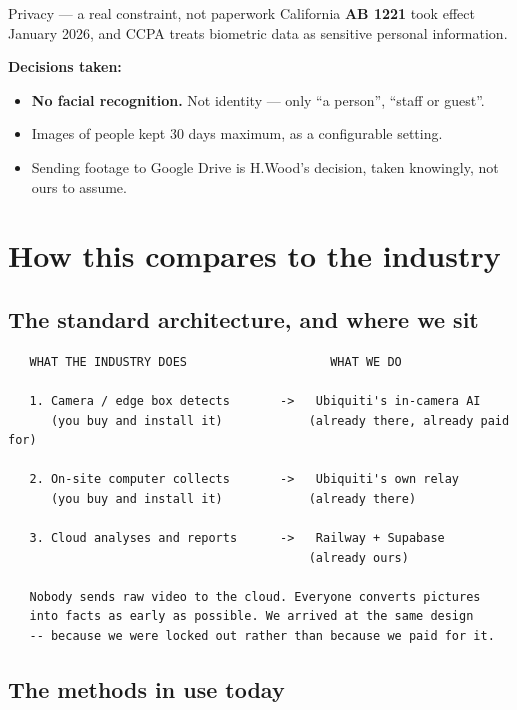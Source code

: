 \documentclass[11pt,a4paper]{article}
\begin{document}
\begin{alert}{Privacy --- a real constraint, not paperwork}
California \textbf{AB 1221} took effect January 2026, and CCPA treats
biometric data as sensitive personal information.

\vspace{4pt}
\textbf{Decisions taken:}
\begin{itemize}[leftmargin=14pt,itemsep=1pt]
  \item \textbf{No facial recognition.} Not identity --- only ``a person'',
        ``staff or guest''.
  \item Images of people kept 30 days maximum, as a configurable setting.
  \item Sending footage to Google Drive is H.Wood's decision, taken
        knowingly, not ours to assume.
\end{itemize}
\end{alert}

\section{How this compares to the industry}

\subsection{The standard architecture, and where we sit}

\begin{verbatim}
   WHAT THE INDUSTRY DOES                    WHAT WE DO

   1. Camera / edge box detects       ->   Ubiquiti's in-camera AI
      (you buy and install it)            (already there, already paid for)

   2. On-site computer collects       ->   Ubiquiti's own relay
      (you buy and install it)            (already there)

   3. Cloud analyses and reports      ->   Railway + Supabase
                                          (already ours)

   Nobody sends raw video to the cloud. Everyone converts pictures
   into facts as early as possible. We arrived at the same design
   -- because we were locked out rather than because we paid for it.
\end{verbatim}

\subsection{The methods in use today}
\end{document}
